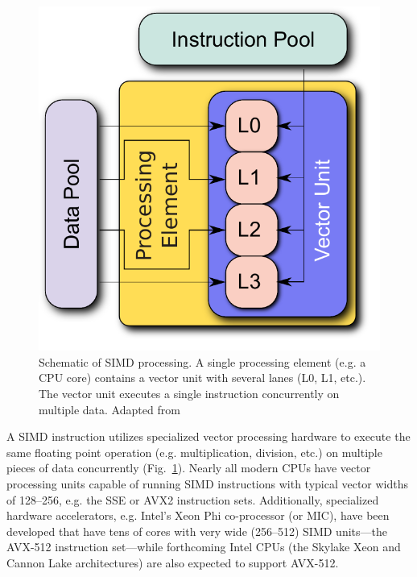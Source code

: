 \documentclass[12pt]{ussci}
\begin{document}
\begin{figure}[ht]
	\centering
	\includegraphics[width=0.33\linewidth]{SIMD.pdf}
	\caption{Schematic of SIMD processing.  A single processing element (e.g. a CPU core) contains a vector unit with several lanes (L0, L1, etc.).  The vector unit executes a single instruction concurrently on multiple data. Adapted from\cite{Simdfig:2016}}
	\label{F:SIMD}
\end{figure}

A SIMD instruction utilizes specialized vector processing hardware to execute the same floating point operation (e.g. multiplication, division, etc.) on multiple pieces of data concurrently (Fig.~\ref{F:SIMD}).
Nearly all modern CPUs have vector processing units capable of running SIMD instructions with typical vector widths of \SIrange{128}{256}{\bit}, e.g. the SSE or AVX2 instruction sets.
Additionally, specialized hardware accelerators, e.g. Intel's Xeon Phi co-processor (or MIC), have been developed that have tens of cores with very wide (\SIrange{256}{512}{\bit}) SIMD units---the AVX-512 instruction set---while forthcoming Intel CPUs (the Skylake Xeon and Cannon Lake architectures) are also expected to support AVX-512.
\end{document}
